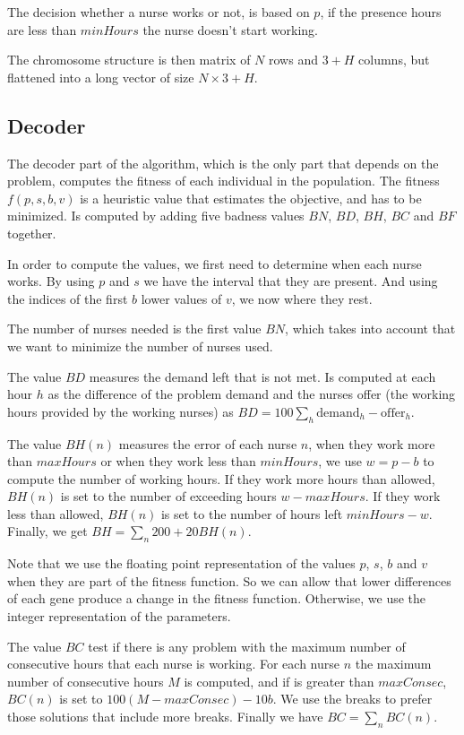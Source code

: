 \documentclass[12pt,a4paper]{article}
\begin{document}
The decision whether a nurse works or not, is based on $p$, if the presence 
hours are less than $minHours$ the nurse doesn't start working.

The chromosome structure is then matrix of $N$ rows and $3+H$ columns, but 
flattened into a long vector of size $N \times 3+H$.

\subsection{Decoder}

The decoder part of the algorithm, which is the only part that depends on the 
problem, computes the fitness of each individual in the population. The fitness 
$f(p,s,b,v)$ is a heuristic value that estimates the objective, and has to be 
minimized. Is computed by adding five badness values $BN$, $BD$, $BH$, $BC$ and 
$BF$ together.

In order to compute the values, we first need to determine when each nurse 
works. By using $p$ and $s$ we have the interval that they are present.  And 
using the indices of the first $b$ lower values of $v$, we now where they rest.

The number of nurses needed is the first value $BN$, which takes into account 
that we want to minimize the number of nurses used.

The value $BD$ measures the demand left that is not met. Is computed at each 
hour $h$ as the difference of the problem demand and the nurses offer (the 
working hours provided by the working nurses) as $BD = 100 \sum_h 
\textrm{demand}_h - \textrm{offer}_h$.

The value $BH(n)$ measures the error of each nurse $n$, when they work more than 
$maxHours$ or when they work less than $minHours$, we use $w = p - b$ to compute 
the number of working hours. If they work more hours than allowed, $BH(n)$ is 
set to the number of exceeding hours $w - maxHours$. If they work less than 
allowed, $BH(n)$ is set to the number of hours left $minHours - w$.  Finally, we 
get $BH = \sum_n 200 + 20 BH(n)$.

Note that we use the floating point representation of the values $p$, $s$, $b$ 
and $v$ when they are part of the fitness function. So we can allow that lower 
differences of each gene produce a change in the fitness function. Otherwise, we 
use the integer representation of the parameters.

The value $BC$ test if there is any problem with the maximum number of 
consecutive hours that each nurse is working. For each nurse $n$ the maximum 
number of consecutive hours $M$ is computed, and if is greater than $maxConsec$, 
$BC(n)$ is set to $100(M - maxConsec) - 10b$. We use the breaks to prefer those 
solutions that include more breaks. Finally we have $BC = \sum_n BC(n)$.
\end{document}
